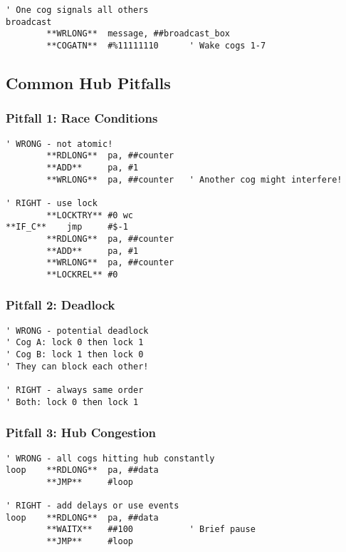 \documentclass[11pt]{book}
\begin{document}
\begin{lstlisting}
' One cog signals all others
broadcast
        **WRLONG**  message, ##broadcast_box
        **COGATN**  #%11111110      ' Wake cogs 1-7
\end{lstlisting}

\hypertarget{common-hub-pitfalls}{%
\subsection{Common Hub Pitfalls}\label{common-hub-pitfalls}}

\hypertarget{pitfall-1-race-conditions}{%
\subsubsection{Pitfall 1: Race
Conditions}\label{pitfall-1-race-conditions}}

\begin{lstlisting}
' WRONG - not atomic!
        **RDLONG**  pa, ##counter
        **ADD**     pa, #1
        **WRLONG**  pa, ##counter   ' Another cog might interfere!
        
' RIGHT - use lock
        **LOCKTRY** #0 wc
**IF_C**    jmp     #$-1
        **RDLONG**  pa, ##counter
        **ADD**     pa, #1
        **WRLONG**  pa, ##counter
        **LOCKREL** #0
\end{lstlisting}

\hypertarget{pitfall-2-deadlock}{%
\subsubsection{Pitfall 2: Deadlock}\label{pitfall-2-deadlock}}

\begin{lstlisting}
' WRONG - potential deadlock
' Cog A: lock 0 then lock 1
' Cog B: lock 1 then lock 0
' They can block each other!

' RIGHT - always same order
' Both: lock 0 then lock 1
\end{lstlisting}

\hypertarget{pitfall-3-hub-congestion}{%
\subsubsection{Pitfall 3: Hub
Congestion}\label{pitfall-3-hub-congestion}}

\begin{lstlisting}
' WRONG - all cogs hitting hub constantly
loop    **RDLONG**  pa, ##data
        **JMP**     #loop
        
' RIGHT - add delays or use events
loop    **RDLONG**  pa, ##data
        **WAITX**   ##100           ' Brief pause
        **JMP**     #loop
\end{lstlisting}
\end{document}
